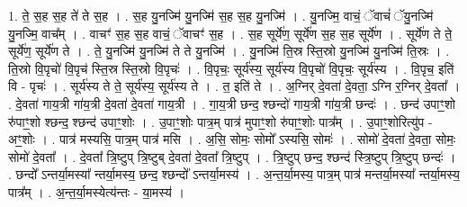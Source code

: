 \documentclass[17pt]{extarticle}
\begin{document}
1. ते॒ स॒ह स॒ह ते॑ ते स॒ह । . स॒ह यु॒नज्मि॑ यु॒नज्मि॑ स॒ह स॒ह यु॒नज्मि॑ । . यु॒नज्मि॒ वाचं॒ ॅवाचं॑ ॅयु॒नज्मि॑ यु॒नज्मि॒ वाच᳚म् । . वाचꣳ॑ स॒ह स॒ह वाचं॒ ॅवाचꣳ॑ स॒ह । . स॒ह सूर्ये॑ण॒ सूर्ये॑ण स॒ह स॒ह सूर्ये॑ण । . सूर्ये॑ण ते ते॒ सूर्ये॑ण॒ सूर्ये॑ण ते । . ते॒ यु॒नज्मि॑ यु॒नज्मि॑ ते ते यु॒नज्मि॑ । . यु॒नज्मि॑ ति॒स्र स्ति॒स्रो यु॒नज्मि॑ यु॒नज्मि॑ ति॒स्रः । . ति॒स्रो वि॒पृचो॑ वि॒पृच॑ स्ति॒स्र स्ति॒स्रो वि॒पृचः॑ । . वि॒पृचः॒ सूर्य॑स्य॒ सूर्य॑स्य वि॒पृचो॑ वि॒पृचः॒ सूर्य॑स्य । . वि॒पृच॒ इति॑ वि - पृचः॑ । . सूर्य॑स्य ते ते॒ सूर्य॑स्य॒ सूर्य॑स्य ते । . त॒ इति॑ ते । . अ॒ग्निर् दे॒वता॑ दे॒वता॒ ऽग्नि र॒ग्निर् दे॒वता᳚ । . दे॒वता॑ गाय॒त्री गा॑य॒त्री दे॒वता॑ दे॒वता॑ गाय॒त्री । . गा॒य॒त्री छन्द॒ श्छन्दो॑ गाय॒त्री गा॑य॒त्री छन्दः॑ । . छन्द॑ उपाꣳ॒॒शो रु॑पाꣳ॒॒शो श्छन्द॒ श्छन्द॑ उपाꣳ॒॒शोः । . उ॒पाꣳ॒॒शोः पात्र॒म् पात्र॑ मुपाꣳ॒॒शो रु॑पाꣳ॒॒शोः पात्र᳚म् । . उ॒पाꣳ॒॒शोरित्यु॑प - अꣳ॒॒शोः । . पात्र॑ मस्यसि॒ पात्र॒म् पात्र॑ मसि । . अ॒सि॒ सोमः॒ सोमो᳚ ऽस्यसि॒ सोमः॑ । . सोमो॑ दे॒वता॑ दे॒वता॒ सोमः॒ सोमो॑ दे॒वता᳚ । . दे॒वता᳚ त्रि॒ष्टुप् त्रि॒ष्टुब् दे॒वता॑ दे॒वता᳚ त्रि॒ष्टुप् । . त्रि॒ष्टुप् छन्द॒ श्छन्द॑ स्त्रि॒ष्टुप् त्रि॒ष्टुप् छन्दः॑ । . छन्दो᳚ ऽन्तर्या॒मस्या᳚ न्तर्या॒मस्य॒ छन्द॒ श्छन्दो᳚ ऽन्तर्या॒मस्य॑ । . अ॒न्त॒र्या॒मस्य॒ पात्र॒म् पात्र॑ मन्तर्या॒मस्या᳚ न्तर्या॒मस्य॒ पात्र᳚म् । . अ॒न्त॒र्या॒मस्येत्य॑न्तः - या॒मस्य॑ । \newline
\end{document}

